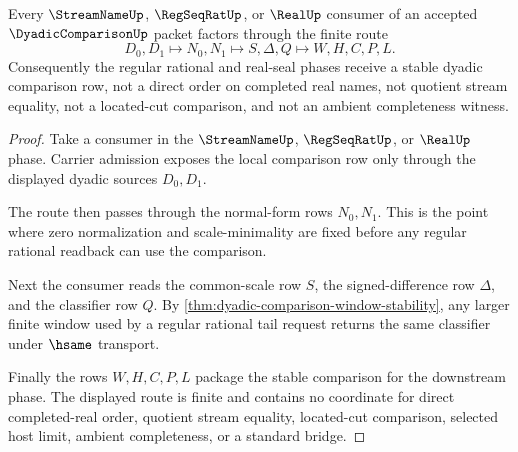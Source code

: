 \begin{theorem}
\label{thm:dyadic-comparison-regseqrat-handoff}
Every $\StreamNameUp$, $\RegSeqRatUp$, or $\RealUp$ consumer of an accepted $\DyadicComparisonUp$ packet factors through the finite route
$$
D_0,D_1 \longmapsto N_0,N_1 \longmapsto S,\Delta,Q \longmapsto W,H,C,P,L .
$$
Consequently the regular rational and real-seal phases receive a stable dyadic comparison row, not a direct order on completed real names, not quotient stream equality, not a located-cut comparison, and not an ambient completeness witness.
\end{theorem}
\begin{proof}
Take a consumer in the $\StreamNameUp$, $\RegSeqRatUp$, or $\RealUp$ phase. Carrier admission exposes the local comparison row only through the displayed dyadic sources $D_0,D_1$.

The route then passes through the normal-form rows $N_0,N_1$. This is the point where zero normalization and scale-minimality are fixed before any regular rational readback can use the comparison.

Next the consumer reads the common-scale row $S$, the signed-difference row $\Delta$, and the classifier row $Q$. By \autoref{thm:dyadic-comparison-window-stability}, any larger finite window used by a regular rational tail request returns the same classifier under $\hsame$ transport.

Finally the rows $W,H,C,P,L$ package the stable comparison for the downstream phase. The displayed route is finite and contains no coordinate for direct completed-real order, quotient stream equality, located-cut comparison, selected host limit, ambient completeness, or a standard bridge.
\end{proof}


\begin{closurestatus}{\DyadicComparisonUp}
  \theoryclosure{\seedClosure}
  \formalstatus{\unformalizedV}
\end{closurestatus}
